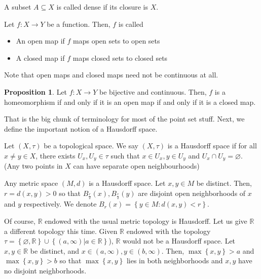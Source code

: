 \documentclass[12pt,reqno]{amsart}
\numberwithin{theorem}{section}
\theoremstyle{definition}
\theoremstyle{remark}
\numberwithin{equation}{section}
\newcommand{\set}[1]{\left \{ #1 \right \}}
\theoremstyle{definition}
\newtheorem{prop}[theorem]{Proposition}
\newcommand{\R}{\mathbb{R}}
\begin{document}
\begin{definition}
    A subset $A \subseteq X$ is called dense if its closure is $X$.
\end{definition}
\begin{definition}
    Let $f:X\rightarrow Y$ be a function. Then, $f$ is called
    \begin{itemize}
        \item An open map if $f$ maps open sets to open sets
        \item A closed map if $f$ maps closed sets to closed sets
    \end{itemize}
\end{definition}
Note that open maps and closed maps need not be continuous at all.
\begin{prop}
    Let $f:X\rightarrow Y$ be bijective and continuous. Then, $f$ is a homeomorphism if and only if it is an open map if and only if it is a closed map.
\end{prop}
That is the big chunk of terminology for most of the point set stuff. Next, we define the important notion of a Hausdorff space.
\begin{definition}
    Let $(X,\tau)$ be a topological space. We say $(X,\tau)$ is a Hausdorff space if for all $x\neq y \in X$, there exists $U_x,U_y \in \tau$ such that $x \in U_x, y \in U_y$ and $U_x \cap U_y = \varnothing$.  (Any two points in $X$ can have separate open neighbourhoods)
\end{definition}
\begin{example}
    Any metric space $(M,d)$ is a Hausdorff space. Let $x,y \in M$ be distinct. Then, $r=d(x,y) > 0$ so that $B_\frac{r}{2}(x),B_{\frac{r} 2}(y)$ are disjoint open neighborhoods of $x$ and $y$ respectively. We denote $B_r (x) = \set{y \in M : d(x,y)< r}$.
\end{example}
\begin{example}
    Of course, $\mathbb{R}$ endowed with the usual metric topology is Hausdorff. Let us give $\mathbb R$ a different topology this time. Given $\mathbb{R}$ endowed with the topology $\tau = \set{\varnothing,\mathbb{R}}\cup\set{(a,\infty) | a\in\mathbb{R}}$), $\R$ would not be a Hausdorff space. Let $x,y \in \mathbb R$ be distinct, and $x\in (a,\infty), y \in (b,\infty)$. Then, $\max \set{x,y} > a$ and $\max \set{x,y} > b$ so that $\max \set{x,y}$ lies in both neighborhoods and $x,y$ have no disjoint neighborhoods. 
\end{example}
\end{document}
